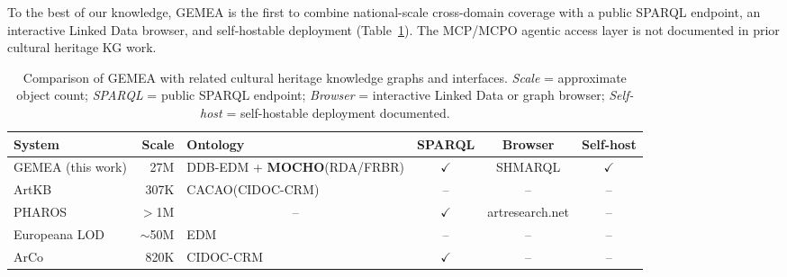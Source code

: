 To the best of our knowledge, GEMEA is the first to combine national-scale cross-domain coverage with a public SPARQL endpoint, an interactive Linked Data browser, and self-hostable deployment (Table~\ref{tab:related}).
The MCP/MCPO agentic access layer is not documented in prior cultural heritage KG work.

\begin{table}[t]
\caption{Comparison of GEMEA with related cultural heritage knowledge graphs and interfaces. \emph{Scale} = approximate object count; \emph{SPARQL} = public SPARQL endpoint; \emph{Browser} = interactive Linked Data or graph browser; \emph{Self-host} = self-hostable deployment documented.}
\label{tab:related}
\centering
\begin{tabular}{|l|r|p{2.5cm}|c|c|c|}
\hline
\textbf{System} & \textbf{Scale} & \textbf{Ontology} & \textbf{SPARQL} & \textbf{Browser} & \textbf{Self-host} \\
\hline
GEMEA (this work)   & 27M  & DDB-EDM + \textbf{MOCHO}\newline(RDA/FRBR) & $\checkmark$ & SHMARQL  & $\checkmark$ \\
\hline
ArtKB~\cite{blanco2026artkb} & 307K & CACAO\newline(CIDOC-CRM) & --     & --       & -- \\
\hline
PHAROS & $>$1M & \multicolumn{1}{c|}{--} & $\checkmark$ & artresearch.net & -- \\
\hline
Europeana LOD~\cite{haslhofer2013europeanalod} & $\sim$50M & EDM & --  & --       & -- \\
\hline
ArCo~\cite{carriero2019arco} & 820K & CIDOC-CRM & $\checkmark$ & --       & -- \\
\hline
\end{tabular}
\end{table}